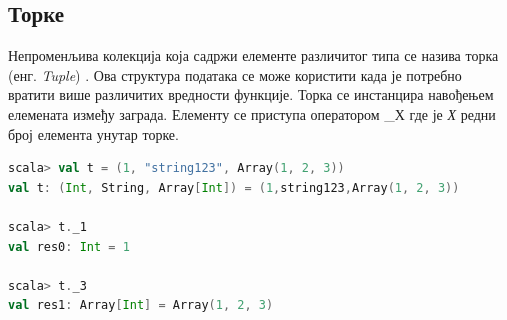 \documentclass[12pt,oneside]{memoir}
\begin{document}
%
%
%


%



\subsection{Торке}
\label{subsec:scala_tuple}

Непроменљива колекција која садржи елементе различитог типа се назива торка (енг. \textit{Tuple}) \cite{scala_prog}. Ова структура података се може користити када је потребно вратити више различитих вредности функције. Торка се инстанцира навођењем елемената између заграда. Елементу се приступа оператором \_Х где је \textit{Х} редни број елемента унутар торке.

\begin{lstlisting}[language=Scala, caption={Пример торке у Скали}, label={lst:scala_coll_tuple_example}, basicstyle=\small]
scala> val t = (1, "string123", Array(1, 2, 3))
val t: (Int, String, Array[Int]) = (1,string123,Array(1, 2, 3))

scala> t._1
val res0: Int = 1

scala> t._3
val res1: Array[Int] = Array(1, 2, 3)
\end{lstlisting}
\end{document}

